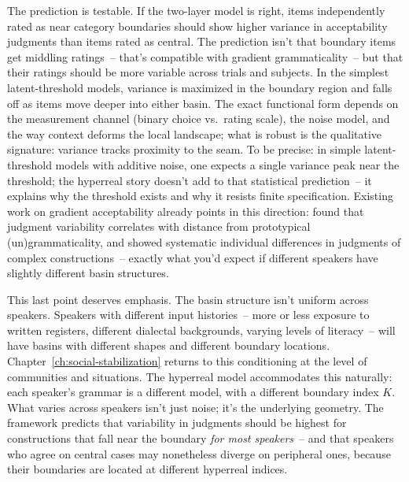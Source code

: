 The prediction is testable. If the two-layer model is right, items independently rated as near category boundaries should show higher variance in acceptability judgments than items rated as central. The prediction isn't that boundary items get middling ratings~-- that's compatible with gradient grammaticality~-- but that their ratings should be more variable across trials and subjects. In the simplest latent-threshold models, variance is maximized in the boundary region and falls off as items move deeper into either basin. The exact functional form depends on the measurement channel (binary choice vs.\ rating scale), the noise model, and the way context deforms the local landscape; what is robust is the qualitative signature: variance tracks proximity to the seam. To be precise: in simple latent-threshold models with additive noise, one expects a single variance peak near the threshold; the hyperreal story doesn't add to that statistical prediction~-- it explains why the threshold exists and why it resists finite specification. Existing work on gradient acceptability already points in this direction: \textcite{sprouse2013} found that judgment variability correlates with distance from prototypical (un)grammaticality, and \textcite{dabrowska2010} showed systematic individual differences in judgments of complex constructions~-- exactly what you'd expect if different speakers have slightly different basin structures.

This last point deserves emphasis. The basin structure isn't uniform across speakers. Speakers with different input histories~-- more or less exposure to written registers, different dialectal backgrounds, varying levels of literacy~-- will have basins with different shapes and different boundary locations. Chapter~\ref{ch:social-stabilization} returns to this conditioning at the level of communities and situations. The hyperreal model accommodates this naturally: each speaker's grammar is a different model, with a different boundary index $K$. What varies across speakers isn't just noise; it's the underlying geometry. The framework predicts that variability in judgments should be highest for constructions that fall near the boundary \emph{for most speakers}~-- and that speakers who agree on central cases may nonetheless diverge on peripheral ones, because their boundaries are located at different hyperreal indices.

